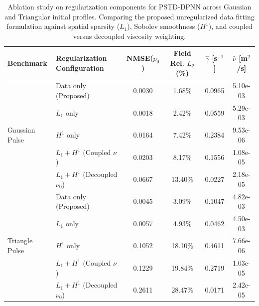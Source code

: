 \begin{table}[H]
\centering
\small
\caption{Ablation study on regularization components for PSTD-DPNN across Gaussian and Triangular initial profiles. Comparing the proposed unregularized data fitting formulation against spatial sparsity ($L_1$), Sobolev smoothness ($H^1$), and coupled versus decoupled viscosity weighting.}
\label{tab:dpnn_ablation}
\begin{tabular}{llcccc}
\toprule
\textbf{Benchmark} & \textbf{Regularization Configuration} & \textbf{NMSE($p_0$)} & \textbf{Field Rel. $L_2$ (\%)} & $\hat{\gamma}$ [s$^{-1}$] & $\hat{\nu}$ [m$^2$/s] \\
\midrule
\multirow{5}{*}{Gaussian Pulse} & Data only (Proposed) & 0.0030 & 1.68\% & 0.0965 & 5.10e-03 \\
 & $L_1$ only & 0.0018 & 2.42\% & 0.0559 & 5.29e-03 \\
 & $H^1$ only & 0.0164 & 7.42\% & 0.2384 & 9.53e-06 \\
 & $L_1 + H^1$ (Coupled $\nu$) & 0.0203 & 8.17\% & 0.1556 & 1.08e-05 \\
 & $L_1 + H^1$ (Decoupled $\nu_0$) & 0.0667 & 13.40\% & 0.0227 & 2.18e-05 \\
\midrule
\multirow{5}{*}{Triangle Pulse} & Data only (Proposed) & 0.0045 & 3.09\% & 0.1047 & 4.82e-03 \\
 & $L_1$ only & 0.0057 & 4.93\% & 0.0462 & 4.50e-03 \\
 & $H^1$ only & 0.1052 & 18.10\% & 0.4611 & 7.66e-06 \\
 & $L_1 + H^1$ (Coupled $\nu$) & 0.1229 & 19.84\% & 0.2719 & 1.03e-05 \\
 & $L_1 + H^1$ (Decoupled $\nu_0$) & 0.2611 & 28.47\% & 0.0171 & 2.42e-05 \\
\bottomrule
\end{tabular}
\end{table}

